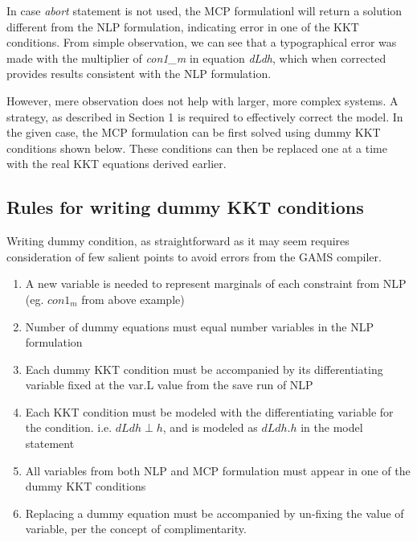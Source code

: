 \documentclass{article}
\begin{document}



\noindent In case \textit{abort} statement is not used, the MCP formulationl will return a solution different from the NLP formulation, indicating
error in one of the KKT conditions. From simple observation, we can see that a typographical error was made with the multiplier of \textit{con1\_m}
in equation \textit{dLdh}, which when corrected provides results consistent with the NLP formulation.

However, mere observation does not help with larger, more complex  systems. A strategy, as described in Section 1 is required to effectively correct the model.
In the given case, the MCP formulation can be first solved using dummy KKT conditions shown below. These conditions can then be replaced
one at a time with the real KKT equations derived earlier.



\subsection{Rules for writing dummy KKT conditions}

Writing dummy condition, as straightforward as it may seem requires consideration of few salient points to avoid errors from the GAMS compiler.

\begin{enumerate}
	\item A new variable is needed to represent marginals of each constraint from NLP (eg. $con1_m$ from above example)
  \item Number of dummy equations must equal number variables in the NLP formulation
	\item Each dummy KKT condition must be accompanied by its differentiating variable fixed at the var.L value from the save run of NLP
	\item Each KKT condition must be modeled with the differentiating variable for the condition. i.e. $dLdh \perp h$,
        and is modeled as $dLdh.h$ in the model statement
	\item All variables from both NLP and MCP formulation must appear in one of the dummy KKT conditions
  \item Replacing a dummy equation must be accompanied by un-fixing the value of variable, per the concept of complimentarity.

\end{enumerate}
\end{document}
